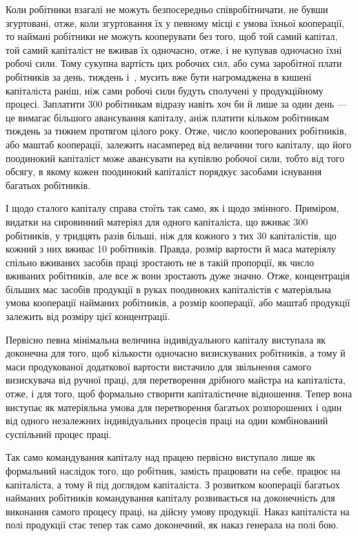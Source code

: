 

Коли робітники взагалі не можуть безпосередньо співробітничати,
не бувши згуртовані, отже, коли згуртовання їх у певному
місці є умова їхньої кооперації, то наймані робітники не можуть
кооперувати без того, щоб той самий капітал, той самий капіталіст
не вживав їх одночасно, отже, і не купував одночасно їхні робочі
сили. Тому сукупна вартість цих робочих сил, або сума заробітної
плати робітників за день, тиждень і~, мусить вже бути нагромаджена
в кишені капіталіста раніш, ніж сами робочі сили будуть
сполучені у продукційному процесі. Заплатити 300 робітникам
відразу навіть хоч би й лише за один день — це вимагає
більшого авансування капіталу, аніж платити кільком робітникам
тиждень за тижнем протягом цілого року. Отже, число
кооперованих робітників, або маштаб кооперації, залежить насамперед
від величини того капіталу, що його поодинокий капіталіст
може авансувати на купівлю робочої сили, тобто від того обсягу,
в якому кожен поодинокий капіталіст порядкує засобами
існування багатьох робітників.

І щодо сталого капіталу справа стоїть так само, як і щодо
змінного. Приміром, видатки на сировинний матеріял для одного
капіталіста, що вживає 300 робітників, у тридцять разів більші,
ніж для кожного з тих 30 капіталістів, що кожний з них вживає
10 робітників. Правда, розмір вартости й маса матеріялу спільно
вживаних засобів праці зростають не в такій пропорції, як число
вживаних робітників, але все ж вони зростають дуже значно.
Отже, концентрація більших мас засобів продукції в руках поодиноких
капіталістів є матеріяльна умова кооперації найманих
робітників, а розмір кооперації, або маштаб продукції залежить
від розміру цієї концентрації.

Первісно певна мінімальна величина індивідуального капіталу
виступала як доконечна для того, щоб кількости одночасно
визискуваних робітників, а тому й маси продукованої додаткової
вартости вистачило для звільнення самого визискувача від ручної
праці, для перетворення дрібного майстра на капіталіста, отже,
і для того, щоб формально створити капіталістичне відношення.
Тепер вона виступає як матеріяльна умова для перетворення
багатьох розпорошених і один від одного незалежних індивідуальних
процесів праці на один комбінований суспільний процес
праці.

Так само командування капіталу над працею первісно виступало
лише як формальний наслідок того, що робітник, замість
працювати на себе, працює на капіталіста, а тому й під доглядом
капіталіста. З розвитком кооперації багатьох найманих робітників
командування капіталу розвивається на доконечність для
виконання самого процесу праці, на дійсну умову продукції.
Наказ капіталіста на полі продукції стає тепер так само доконечний,
як наказ генерала на полі бою.

